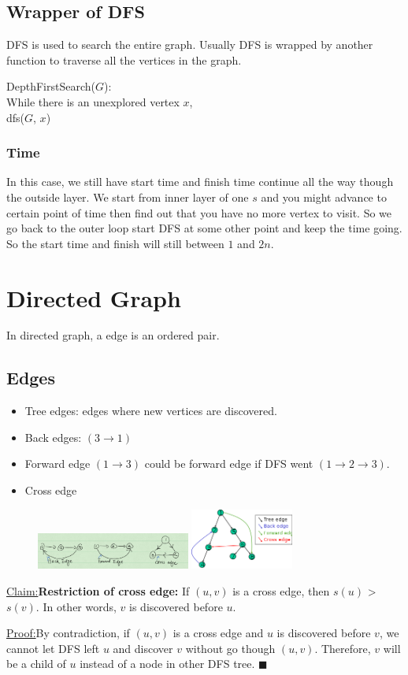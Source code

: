 \documentclass[en,hazy,blue,normal,12pt]{elegantnote}
\newcommand\tab[1][1cm]{\hspace*{#1}}
\newenvironment{claim}[1]{\par\noindent\underline{Claim:}\space#1}{}
\newenvironment{claimproof}[1]{\par\noindent\underline{Proof:}\space#1}{\hfill $\blacksquare$}
\begin{document}
\subsection{Wrapper of DFS}
DFS is used to search the entire graph. Usually DFS is wrapped by another 
function to traverse all the vertices in the graph.

DepthFirstSearch($G$):\\
\tab \tab While there is an unexplored vertex $x$,\\
\tab \tab \tab dfs($G$, $x$)

\subsubsection{Time}
In this case, we still have start time and finish time continue all the way 
though the outside layer. We start from inner layer of one $s$ and you might 
advance to certain point of time then find out that you have no more vertex to 
visit. So we go back to the outer loop start DFS at some other point and keep 
the time going. So the start time and finish will still between $1$ and $2n$.
\section{Directed Graph}
In directed graph, a edge is an ordered pair. 
\subsection{Edges}
\begin{itemize}
 \item Tree edges: edges where new vertices are discovered.
 \item Back edges: $(3 \rightarrow 1)$
 \item Forward edge $(1 \rightarrow 3)$ could be forward edge if DFS went $(1 
\rightarrow 2 \rightarrow 3)$.
 \item Cross edge
\end{itemize}

\begin{figure}[H]
\centering
\includegraphics[width=0.45\textwidth]{edges.png}
\includegraphics[width=0.3\textwidth]{edges-2.png}
\end{figure}
\begin{claim}
\textbf{Restriction of cross edge:} If $(u, v)$ is a cross edge, then 
$s(u)$ > $s(v)$. In other words, $v$ is discovered before $u$.
\end{claim}
\begin{claimproof}
By contradiction, if $(u, v)$ is a cross edge and $u$ is discovered before $v$, 
we cannot let DFS left $u$ and discover $v$ without go though $(u, v)$. 
Therefore, $v$ will be a child of $u$ instead of a node in other DFS tree.
\end{claimproof}
\end{document}
